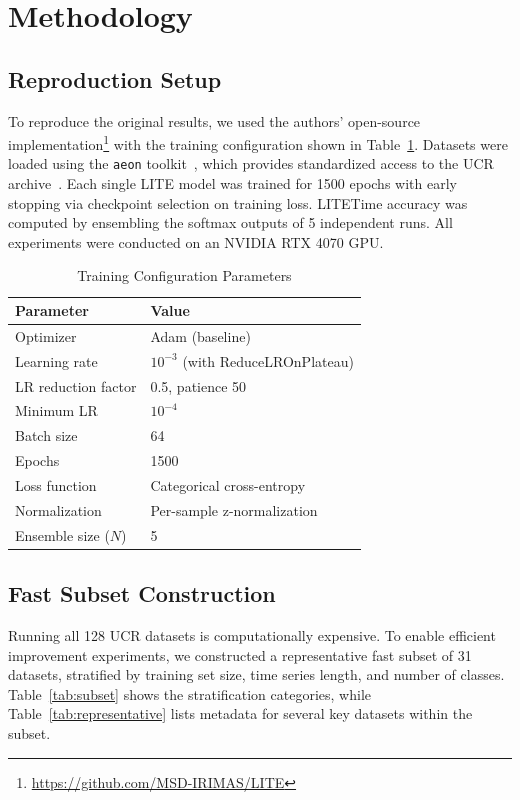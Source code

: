 \documentclass[conference]{IEEEtran}
\begin{document}
\section{Methodology}

\subsection{Reproduction Setup}

To reproduce the original results, we used the authors' open-source implementation\footnote{\url{https://github.com/MSD-IRIMAS/LITE}} with the training configuration shown in Table~\ref{tab:config}. Datasets were loaded using the \texttt{aeon} toolkit~\cite{aeon2024}, which provides standardized access to the UCR archive~\cite{dau2019ucr}. Each single LITE model was trained for 1500 epochs with early stopping via checkpoint selection on training loss. LITETime accuracy was computed by ensembling the softmax outputs of 5 independent runs. All experiments were conducted on an NVIDIA RTX 4070 GPU.

\begin{table}[htbp]
\caption{Training Configuration Parameters}
\label{tab:config}
\centering
\begin{tabular}{ll}
\toprule
\textbf{Parameter} & \textbf{Value} \\
\midrule
Optimizer & Adam (baseline) \\
Learning rate & $10^{-3}$ (with ReduceLROnPlateau) \\
LR reduction factor & 0.5, patience 50 \\
Minimum LR & $10^{-4}$ \\
Batch size & 64 \\
Epochs & 1500 \\
Loss function & Categorical cross-entropy \\
Normalization & Per-sample z-normalization \\
Ensemble size ($N$) & 5 \\
\bottomrule
\end{tabular}
\end{table}

\subsection{Fast Subset Construction}

Running all 128 UCR datasets is computationally expensive. To enable efficient improvement experiments, we constructed a representative fast subset of 31 datasets, stratified by training set size, time series length, and number of classes. Table~\ref{tab:subset} shows the stratification categories, while Table~\ref{tab:representative} lists metadata for several key datasets within the subset.
\end{document}
